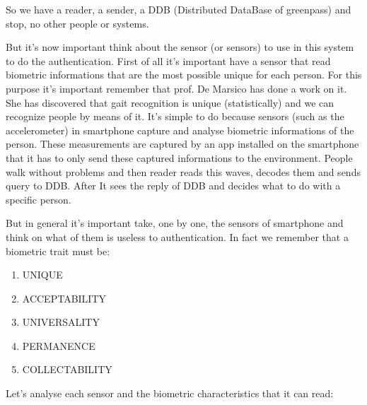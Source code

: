 \documentclass[12pt]{article}
\begin{document}
So we have a reader, a sender, a DDB (Distributed DataBase of greenpass) and stop, no other people or systems.

But it's now important think about the sensor (or sensors) to use in this system to do the authentication. First of all it's important have a sensor that read biometric informations that are the most possible unique for each person. For this purpose it's important remember that prof. De Marsico has done a work on it. She has discovered that gait recognition is unique (statistically) and we can recognize people by means of it. It's simple to do because sensors (such as the accelerometer) in smartphone capture and analyse biometric informations of the person. These measurements are captured by an app installed on the smartphone that it has to only send these captured informations to the environment. People walk without problems and then reader reads this waves, decodes them and sends query to DDB. After It sees the reply of DDB and decides what to do with a specific person.

But in general it's important take, one by one, the sensors of smartphone and think on what of them is useless to authentication. In fact we remember that a biometric trait must be:

\begin{enumerate}

\item UNIQUE
\item ACCEPTABILITY
\item UNIVERSALITY
\item PERMANENCE
\item COLLECTABILITY

\end{enumerate}

Let's analyse each sensor and the biometric characteristics that it can read:
\end{document}
